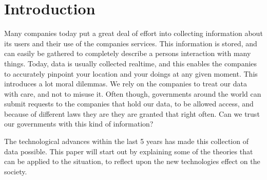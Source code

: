 \section{Introduction}
Many companies today put a great deal of effort into collecting information about its users and their use of the companies services. This information is stored, and can easily be gathered to completely describe a persons interaction with many things. Today, data is usually collected realtime, and this enables the companies to accurately pinpoint your location and your doings at any given moment. This introduces a lot moral dilemmas. We rely on the companies to treat our data with care, and not to misuse it. Often though, governments around the world can submit requests to the companies that hold our data, to be allowed access, and because of different laws they are they are granted that right often. Can we trust our governments with this kind of information?

The technological advances within the last 5 years has made this collection of data possible.
This paper will start out by explaining some of the theories that can be applied to the situation, to reflect upon the new technologies effect on the society.
\newpage
